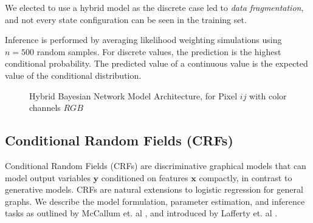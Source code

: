 \documentclass{article}
\begin{document}
We elected to use a hybrid model as the discrete case led to
\textit{data fragmentation}, and not every state configuration can be seen
in the training set.

Inference is performed by averaging likelihood weighting simulations using
$n=500$ random samples. For discrete values, the prediction is the highest
conditional probability. The predicted value of a continuous value is the
expected value of the conditional distribution.

\begin{figure}
  \centering
  \caption{Hybrid Bayesian Network Model Architecture, for Pixel $ij$ with color channels $RGB$}
  \label{fig:net-structure}
\end{figure}

\subsection{Conditional Random Fields (CRFs)}
\label{sec:CRF}
Conditional Random Fields (CRFs) are discriminative graphical models that
can model output variables $\mathbf{y}$ conditioned on features $\mathbf{x}$
compactly, in contrast to generative models. CRFs are natural extensions
to logistic regression for general graphs. We describe the model formulation,
parameter estimation, and inference tasks as outlined by McCallum et. al \cite{McCallumCRF},
and introduced by Lafferty et. al \cite{CRF}.
\end{document}
